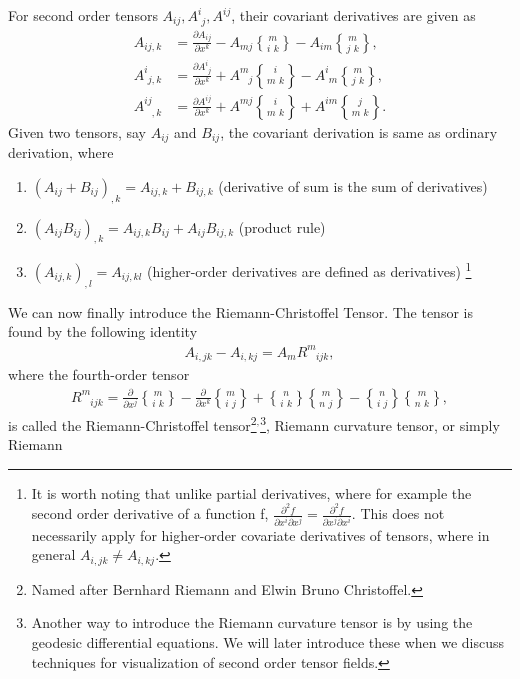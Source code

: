 \documentclass[main.tex]{subfiles}
\begin{document}
For second order tensors $A_{ij}, A^i_{\phantom{i}j}, A^{ij}$, their covariant derivatives are
given as
\begin{align*}
A_{ij,k} &= \frac{\partial A_{ij}}{\partial x^k}  - 
				  A_{mj}{m \brace i\,\,k} - 
				  A_{im}{m \brace j\,\,k},\\ 
A^i_{\phantom{i}j,k} &= \frac{\partial A^i_{\phantom{i}j}}{\partial x^k}  + 
				 A^m_{\phantom{m}j}{i \brace m\,\,k} - 
				 A^i_{\phantom{i}m}{m \brace j\,\,k},\\
A^{ij}_{\phantom{ij},k} &= \frac{\partial A^{ij}}{\partial x^k}  + 
				   A^{mj}{i \brace m\,\,k} +
				   A^{im}{j \brace m\,\,k}.
\end{align*}
Given two tensors, say $A_{ij}$ and $B_{ij}$, the covariant derivation is same
as ordinary derivation, where
\begin{enumerate}
\item $(A_{ij} + B_{ij})_{,k} = A_{ij,k} + B_{ij,k}$ (derivative of sum is the sum of derivatives)
\vspace{-2mm}
\item $(A_{ij}B_{ij})_{,k} = A_{ij,k}B_{ij} + A_{ij}B_{ij,k}$ (product rule)
\vspace{-2mm}
\item $(A_{ij,k})_{,l} = A_{ij,kl}$ (higher-order derivatives are defined as derivatives)
\footnote{It is worth noting that unlike partial derivatives, where for example the second 
order derivative of a function f, $\frac{\partial^2 f}{\partial x^i\partial x^j} = \frac{\partial^2 f}
{\partial x^j\partial x^i}$. This does not necessarily apply for higher-order covariate 
derivatives of tensors, where in general $A_{i,jk} \neq A_{i,kj}.$}
\end{enumerate}
\vspace{3mm}We can now finally introduce the Riemann-Christoffel Tensor. The tensor is
found by the following identity
\begin{align}
A_{i,jk} - A_{i,kj} = A_m R^m_{\phantom{m}ijk},
\end{align}
where the fourth-order tensor
\begin{align}
\label{eq:RCT}
R^m_{\phantom{m}ijk} =  
\frac{\partial}{\partial x^j}{m \brace i\,\,k} - \frac{\partial}{\partial  x^k}{m \brace i\,\,j} + 
{n \brace i\,\,k}{m \brace n\,\,j} - {n \brace i\,\,j}{m \brace n\,\,k},
\end{align}
is called the Riemann-Christoffel tensor\footnote{Named after Bernhard Riemann and Elwin Bruno
Christoffel.}$\phantom{}^,$\footnote{Another way to introduce the Riemann curvature tensor is by using the 
geodesic differential equations. We will later introduce these when we discuss techniques for 
visualization of second order tensor fields.}, Riemann curvature tensor, or simply Riemann
\end{document}
